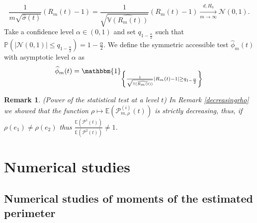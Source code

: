 \documentclass[12pt]{article}
\renewcommand{\hat}{\widehat}
\theoremstyle{Theorem}
\newtheorem{remark}{Remark}
\begin{document}
$$ \frac{1}{m\sqrt{\hat{\sigma}(t)}}\left(R_{m}(t) - 1 \right) = \frac{1}{\sqrt{\hat{\mathbb{V}\left(R_{m}(t)\right)}}}\left(R_{m}(t) - 1 \right)   \xrightarrow[m \to \infty]{d, H_{0}} \mathcal{N}\left(0, 1 \right).$$
Take a confidence level $\alpha \in (0,1)$ and set $q_{1-\frac{\alpha}{2}}$ such that $\mathbb{P}\left(|\mathcal{N}\left(0,1\right)| \leq  q_{1-\frac{\alpha}{2}} \right) = 1 - \frac{\alpha}{2}$. We define the symmetric accessible test $\hat{\phi}_{m}(t)$ with asymptotic level $\alpha$ as 
\begin{equation}
\label{phihat}
\hat{\phi}_{m}(t)= \mathbbm{1}_{\left\{ \frac{1}{\sqrt{\hat{\mathbb{V}\left(R_{m}(t)\right)}}}\left|R_{m}(t) - 1 \right| \geq q_{1- \frac{\alpha}{2}} \right\}}
\end{equation}
\begin{remark}(Power of the statistical test at a level $t$) In Remark \ref{decreasingrho} we showed that the function $\rho \mapsto \mathbb{E}\left(\mathcal{P}^{\scriptscriptstyle (i)}_{m, \rho}(t)\right)$ is strictly decreasing, thus, if $\rho(e_1) \neq \rho(e_2)$ thus $\frac{\mathbb{E}\left(\mathcal{P}^{1}(t)\right)}{\mathbb{E}\left(\mathcal{P}^{2}(t)\right)} \neq 1$. 
\end{remark}
\section{Numerical studies}
\subsection{Numerical studies of moments of the estimated perimeter}
\end{document}
